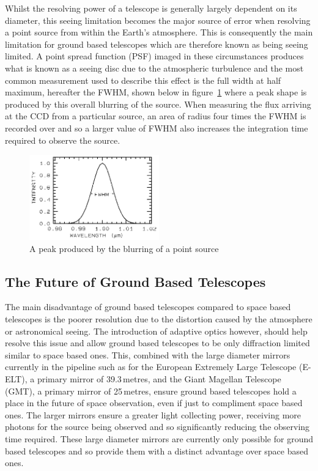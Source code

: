 		Whilst the resolving power of a telescope is generally largely dependent on its diameter, this seeing limitation becomes the major source of error when resolving a point source from within the Earth's atmosphere. This is consequently the main limitation for ground based telescopes which are therefore known as being seeing limited. A point spread function (PSF) imaged in these circumstances produces what is known as a seeing disc due to the atmospheric turbulence and the most common measurement used to describe this effect is the full width at half maximum, hereafter the FWHM, shown below in figure~\ref{fig:FWHM} where a peak shape is produced by this overall blurring of the source. When measuring the flux arriving at the CCD from a particular source, an area of radius four times the FWHM is recorded over and so a larger value of FWHM also increases the integration time required to observe the source.
		\begin{figure}[!htb]
			\centering
			\includegraphics[width=0.5\textwidth]{../Images/FWHM.png}
			\caption{A peak produced by the blurring of a point source}\label{fig:FWHM}
		\end{figure}

	\subsection{The Future of Ground Based Telescopes} %
	\label{sub:the_future_of_ground_based_telescopes}
		The main disadvantage of ground based telescopes compared to space based telescopes is the poorer resolution due to the distortion caused by the atmosphere or astronomical seeing. The introduction of adaptive optics however, should help resolve this issue and allow ground based telescopes to be only diffraction limited similar to space based ones. This, combined with the large diameter mirrors currently in the pipeline such as for the European Extremely Large Telescope (E-ELT), a primary mirror of 39.3\,metres, and the Giant Magellan Telescope (GMT), a primary mirror of 25\,metres, ensure ground based telescopes hold a place in the future of space observation, even if just to compliment space based ones. The larger mirrors ensure a greater light collecting power, receiving more photons for the source being observed and so significantly reducing the observing time required. These large diameter mirrors are currently only possible for ground based telescopes and so provide them with a distinct advantage over space based ones.

